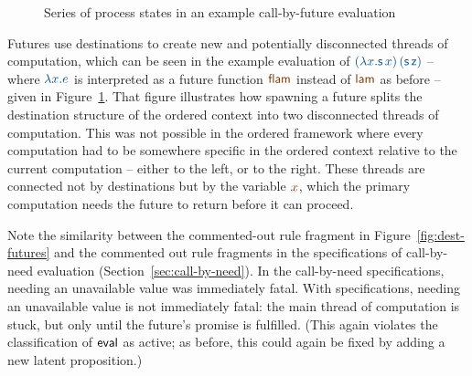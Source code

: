 \begin{figure}
\begin{center}
\end{center}
\caption{Series of process states in an example call-by-future evaluation}
\label{fig:examplefuturefunciton}
\end{figure}

Futures use destinations to create new and potentially disconnected
threads of computation, which can be seen in the example evaluation of
$\obj{(\lambda x. {\sf s}\,x)\,({\sf s}\,{\sf z})}$ -- where
$\obj{\lambda x.e}$ is interpreted as a future function $\lf{\sf
  flam}$ instead of $\lf{\sf lam}$ as before -- given in
Figure~\ref{fig:examplefuturefunciton}. That figure illustrates how
spawning a future splits the destination structure of the ordered
context into two disconnected threads of computation.  This was not
possible in the ordered framework where every computation had to be
somewhere specific in the ordered context relative to the current
computation -- either to the left, or to the right. These threads are
connected not by destinations but by the variable $\lf x$, which the
primary computation needs the future to return before it can proceed.

Note the similarity between the commented-out rule fragment in
Figure~\ref{fig:dest-futures} and the commented out rule fragments in
the specifications of call-by-need evaluation
(Section~\ref{sec:call-by-need}). In the call-by-need specifications,
needing an unavailable value was immediately fatal. With
specifications, needing an unavailable value is not immediately fatal:
the main thread of computation is stuck, but only until the future's
promise is fulfilled. (This again violates the classification of ${\sf eval}$
as active; as before, this could again be fixed by adding a new
latent proposition.)

